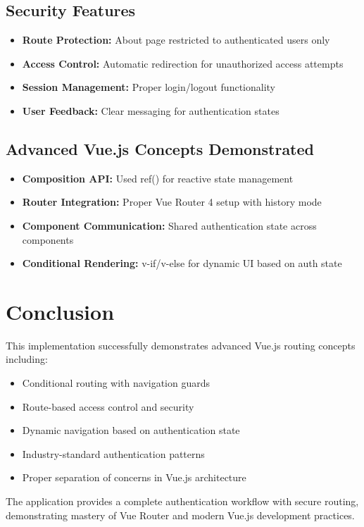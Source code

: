 \documentclass[11pt,a4paper]{article}
\begin{document}
\subsection{Security Features}
\begin{itemize}
    \item \textbf{Route Protection:} About page restricted to authenticated users only
    \item \textbf{Access Control:} Automatic redirection for unauthorized access attempts
    \item \textbf{Session Management:} Proper login/logout functionality
    \item \textbf{User Feedback:} Clear messaging for authentication states
\end{itemize}

\subsection{Advanced Vue.js Concepts Demonstrated}
\begin{itemize}
    \item \textbf{Composition API:} Used ref() for reactive state management
    \item \textbf{Router Integration:} Proper Vue Router 4 setup with history mode
    \item \textbf{Component Communication:} Shared authentication state across components
    \item \textbf{Conditional Rendering:} v-if/v-else for dynamic UI based on auth state
\end{itemize}

\section{Conclusion}

This implementation successfully demonstrates advanced Vue.js routing concepts including:
\begin{itemize}
    \item Conditional routing with navigation guards
    \item Route-based access control and security
    \item Dynamic navigation based on authentication state
    \item Industry-standard authentication patterns
    \item Proper separation of concerns in Vue.js architecture
\end{itemize}

The application provides a complete authentication workflow with secure routing, demonstrating mastery of Vue Router and modern Vue.js development practices.
\end{document}
